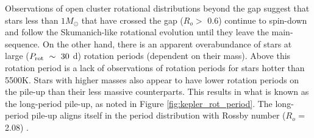 %

Observations of open cluster rotational distributions beyond the gap suggest that stars less than $1M_{\odot}$ that have crossed the gap ($R_o>\,\,$0.6) continue to spin-down and follow the Skumanich-like rotational evolution until they leave the main-sequence.
On the other hand, there is an apparent overabundance of stars at large ($P_{\rm{rot}} \ \sim \ 30$ d) rotation periods (dependent on their mass). 
Above this rotation period is a lack of observations of rotation periods for stars hotter than 5500K.
Stars with higher masses also appear to have lower rotation periods on the pile-up than their less massive counterparts.
This results in what is known as the long-period pile-up, as noted in Figure \ref{fig:kepler_rot_period}.
The long-period pile-up aligns itself in the \citet{mcquillan_rotation_2014} period distribution with Rossby number  ($R_o$ = 2.08) \citep{van_saders_forward_2019}.
 
